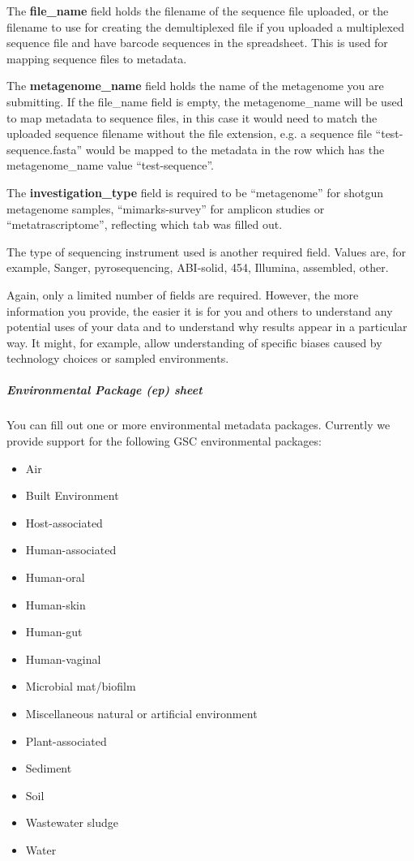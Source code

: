 \documentclass[12pt,fullpage]{report}
\begin{document}
The \textbf{file\_name} field holds the filename of the sequence file uploaded, or the filename to use for creating the demultiplexed file if you uploaded a multiplexed sequence file and have barcode sequences in the spreadsheet. This is used for mapping sequence files to metadata.

The \textbf{metagenome\_name} field holds the name of the metagenome you are submitting. If the file\_name field is empty, the metagenome\_name will be used to map metadata to sequence files, in this case it would need to match the uploaded sequence filename without the file extension, e.g. a sequence file ``test-sequence.fasta'' would be mapped to the metadata in the row which has the metagenome\_name value ``test-sequence''.

The \textbf{investigation\_type} field is required to be ``metagenome'' for shotgun metagenome samples, ``mimarks-survey'' for amplicon studies or ``metatrascriptome'', reflecting which tab was filled out.

The type of sequencing instrument used is another required field. Values are, for example, Sanger, pyrosequencing, ABI-solid, 454, Illumina, assembled, other.

Again, only a limited number of fields are required. However, the more information you provide, the easier it is for you and others to understand any potential uses of your data and to understand why results appear in a particular way. It might, for example, allow understanding of specific biases caused by technology choices or sampled environments.

\subparagraph*{Environmental Package (ep) sheet}
You can fill out one or more environmental metadata packages.  Currently we provide support for the following GSC environmental packages:

\begin{itemize}\addtolength{\itemsep}{-.55\baselineskip}
\item Air
\item Built Environment
\item Host-associated
\item Human-associated
\item Human-oral
\item Human-skin
\item Human-gut
\item Human-vaginal
\item Microbial mat/biofilm
\item Miscellaneous natural or artificial environment
\item Plant-associated
\item Sediment
\item Soil
\item Wastewater sludge
\item Water
\end{itemize}
\end{document}

